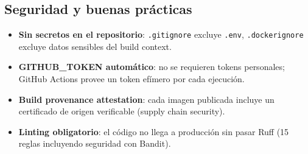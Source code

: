 \subsection{Seguridad y buenas pr\'acticas}

\begin{itemize}
    \item \textbf{Sin secretos en el repositorio}: \texttt{.gitignore} excluye \texttt{.env}, \texttt{.dockerignore} excluye datos sensibles del build context.
    \item \textbf{GITHUB\_TOKEN autom\'atico}: no se requieren tokens personales; GitHub Actions provee un token efímero por cada ejecuci\'on.
    \item \textbf{Build provenance attestation}: cada imagen publicada incluye un certificado de origen verificable (supply chain security).
    \item \textbf{Linting obligatorio}: el c\'odigo no llega a producci\'on sin pasar Ruff (15 reglas incluyendo seguridad con Bandit).
\end{itemize}
